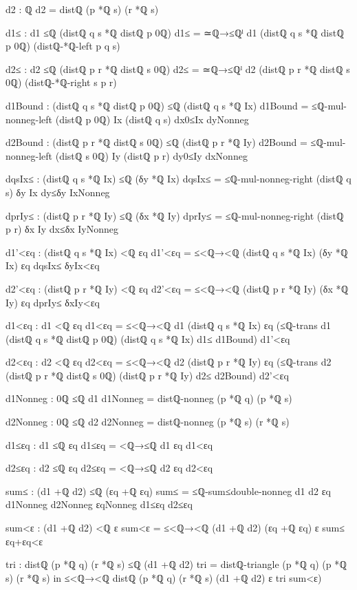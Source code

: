 \documentclass[11pt,a4paper]{book}
\begin{document}
\begin{code}
{          d2 : ℚ
          d2 = distℚ (p *ℚ s) (r *ℚ s)

          d1≤ : d1 ≤ℚ (distℚ q s *ℚ distℚ p 0ℚ)
          d1≤ = ≃ℚ→≤ℚˡ {d1} {(distℚ q s *ℚ distℚ p 0ℚ)} (distℚ-*ℚ-left p q s)

          d2≤ : d2 ≤ℚ (distℚ p r *ℚ distℚ s 0ℚ)
          d2≤ = ≃ℚ→≤ℚˡ {d2} {(distℚ p r *ℚ distℚ s 0ℚ)} (distℚ-*ℚ-right s p r)

          d1Bound : (distℚ q s *ℚ distℚ p 0ℚ) ≤ℚ (distℚ q s *ℚ Ix)
          d1Bound = ≤ℚ-mul-nonneg-left (distℚ p 0ℚ) Ix (distℚ q s) dx0≤Ix dyNonneg

          d2Bound : (distℚ p r *ℚ distℚ s 0ℚ) ≤ℚ (distℚ p r *ℚ Iy)
          d2Bound = ≤ℚ-mul-nonneg-left (distℚ s 0ℚ) Iy (distℚ p r) dy0≤Iy dxNonneg

          dqsIx≤ : (distℚ q s *ℚ Ix) ≤ℚ (δy *ℚ Ix)
          dqsIx≤ = ≤ℚ-mul-nonneg-right (distℚ q s) δy Ix dy≤δy IxNonneg

          dprIy≤ : (distℚ p r *ℚ Iy) ≤ℚ (δx *ℚ Iy)
          dprIy≤ = ≤ℚ-mul-nonneg-right (distℚ p r) δx Iy dx≤δx IyNonneg

          d1'<εq : (distℚ q s *ℚ Ix) <ℚ εq
          d1'<εq = ≤<ℚ→<ℚ {(distℚ q s *ℚ Ix)} {(δy *ℚ Ix)} {εq} dqsIx≤ δyIx<εq

          d2'<εq : (distℚ p r *ℚ Iy) <ℚ εq
          d2'<εq = ≤<ℚ→<ℚ {(distℚ p r *ℚ Iy)} {(δx *ℚ Iy)} {εq} dprIy≤ δxIy<εq

          d1<εq : d1 <ℚ εq
          d1<εq = ≤<ℚ→<ℚ {d1} {(distℚ q s *ℚ Ix)} {εq} (≤ℚ-trans {d1} {(distℚ q s *ℚ distℚ p 0ℚ)} {(distℚ q s *ℚ Ix)} d1≤ d1Bound) d1'<εq

          d2<εq : d2 <ℚ εq
          d2<εq = ≤<ℚ→<ℚ {d2} {(distℚ p r *ℚ Iy)} {εq} (≤ℚ-trans {d2} {(distℚ p r *ℚ distℚ s 0ℚ)} {(distℚ p r *ℚ Iy)} d2≤ d2Bound) d2'<εq

          d1Nonneg : 0ℚ ≤ℚ d1
          d1Nonneg = distℚ-nonneg (p *ℚ q) (p *ℚ s)

          d2Nonneg : 0ℚ ≤ℚ d2
          d2Nonneg = distℚ-nonneg (p *ℚ s) (r *ℚ s)

          d1≤εq : d1 ≤ℚ εq
          d1≤εq = <ℚ→≤ℚ {d1} {εq} d1<εq

          d2≤εq : d2 ≤ℚ εq
          d2≤εq = <ℚ→≤ℚ {d2} {εq} d2<εq

          sum≤ : (d1 +ℚ d2) ≤ℚ (εq +ℚ εq)
          sum≤ = ≤ℚ-sum≤double-nonneg d1 d2 εq d1Nonneg d2Nonneg εqNonneg d1≤εq d2≤εq

          sum<ε : (d1 +ℚ d2) <ℚ ε
          sum<ε = ≤<ℚ→<ℚ {(d1 +ℚ d2)} {(εq +ℚ εq)} {ε} sum≤ εq+εq<ε

          tri : distℚ (p *ℚ q) (r *ℚ s) ≤ℚ (d1 +ℚ d2)
          tri = distℚ-triangle (p *ℚ q) (p *ℚ s) (r *ℚ s)
        in
        ≤<ℚ→<ℚ {distℚ (p *ℚ q) (r *ℚ s)} {(d1 +ℚ d2)} {ε} tri sum<ε)
  }
\end{code}
\end{document}

